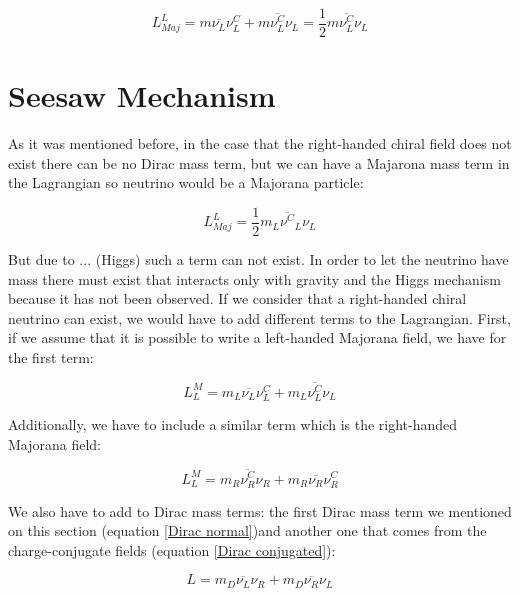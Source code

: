 
\begin{equation}
L_{Maj}^{L} = m \overline{\nu_L} \nu_L^C + m \overline{\nu_L^C} \nu_L = \frac{1}{2} m \overline{\nu_L^{C}} \nu_L
\end{equation}




\section{Seesaw Mechanism}
As it was mentioned before, in the case that the right-handed chiral field does not exist there can be no Dirac mass term, but we can have a Majarona mass term in the Lagrangian so neutrino would be a Majorana particle:

\begin{equation}
L_{Maj}^{L} = \frac{1}{2} m_L \overline{\nu^{C}}_L \nu_L
\end{equation}

But due to ... (Higgs) such a term can not exist. In order to let the neutrino have mass there must exist that interacts only with gravity and the Higgs mechanism because it has not been observed. If we consider that a right-handed chiral neutrino can exist, we would have to add different terms to the Lagrangian. First, if we assume that it is possible to write a left-handed Majorana field, we have for the first term:

\begin{equation}
L_L^{M} = m_L \overline{\nu_L} \nu_{L}^C + m_L \overline{\nu_L^C} \nu_L
\end{equation}

Additionally, we have to include a similar term which is the right-handed Majorana field:

\begin{equation}
L_L^{M} = m_R \overline{\nu_R^C} \nu_{R} + m_R \overline{\nu_R} \nu_R^C
\end{equation}

We also have to add to Dirac mass terms: the first Dirac mass term we mentioned on this section (equation \ref{Dirac normal})and another one that comes from the charge-conjugate fields (equation \ref{Dirac conjugated}):

\begin{equation}\label{Dirac normal}
L = m_D \overline{\nu_L}\nu_R + m_D \overline{\nu_R}\nu_L
\end{equation} 

